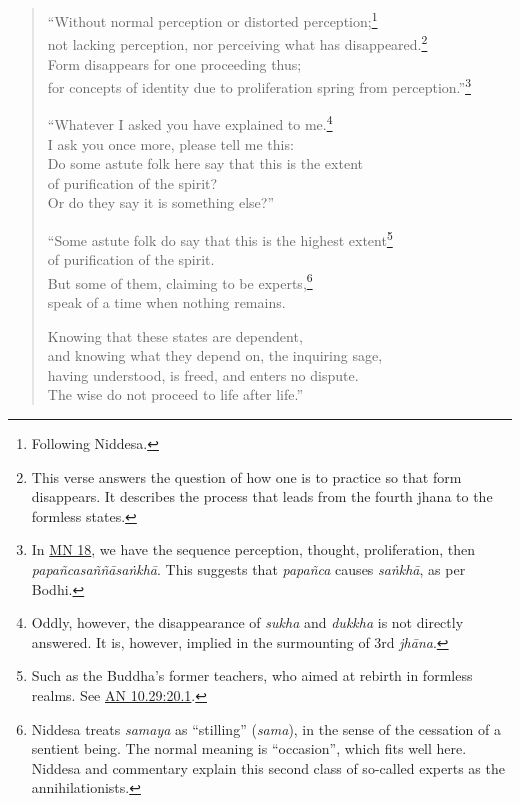 \documentclass[12pt,openany]{book}%
\begin{document}
\begin{verse}
“Without normal perception or distorted perception;\footnote{Following Niddesa. } \\
not lacking perception, nor perceiving what has disappeared.\footnote{This verse answers the question of how one is to practice so that form disappears. It describes the process that leads from the fourth jhana to the formless states. } \\
Form disappears for one proceeding thus; \\
for concepts of identity due to proliferation spring from perception.”\footnote{In \href{https://suttacentral.net/mn18/en/sujato}{MN 18}, we have the sequence perception, thought, proliferation, then \textit{\textsanskrit{papañcasaññāsaṅkhā}}. This suggests that \textit{\textsanskrit{papañca}} causes \textit{\textsanskrit{saṅkhā}}, as per Bodhi. } 

“Whatever I asked you have explained to me.\footnote{Oddly, however, the disappearance of \textit{sukha} and \textit{dukkha} is not directly answered. It is, however, implied in the surmounting of 3rd \textit{\textsanskrit{jhāna}}. } \\
I ask you once more, please tell me this: \\
Do some astute folk here say that this is the extent \\
of purification of the spirit? \\
Or do they say it is something else?” 

“Some astute folk do say that this is the highest extent\footnote{Such as the Buddha’s former teachers, who aimed at rebirth in formless realms. See \href{https://suttacentral.net/an10.29/en/sujato\#20.1}{AN 10.29:20.1}. } \\
of purification of the spirit. \\
But some of them, claiming to be experts,\footnote{Niddesa treats \textit{samaya} as “stilling” (\textit{sama}), in the sense of the cessation of a sentient being. The normal meaning is “occasion”, which fits well here. Niddesa and commentary explain this second class of so-called experts as the annihilationists. } \\
speak of a time when nothing remains. 

Knowing that these states are dependent, \\
and knowing what they depend on, the inquiring sage, \\
having understood, is freed, and enters no dispute. \\
The wise do not proceed to life after life.” 

%
\end{verse}
\end{document}
